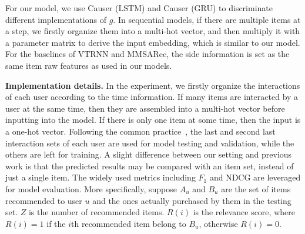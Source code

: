 \documentclass[conference]{IEEEtran}
\theoremstyle{definition}
\theoremstyle{theorem}
\theoremstyle{proof}
\theoremstyle{remark}
\begin{document}
For our model, we use Causer (LSTM) and Causer (GRU) to discriminate different implementations of $g$.
In sequential models, if there are multiple items at a step, we firstly organize them into a multi-hot vector, and then multiply it with a parameter matrix to derive the input embedding, which is similar to our model.
{For the baselines of VTRNN and MMSARec, the side information is set as the same item raw features as used in our models.}



\noindent
\textbf{Implementation details.}
In the experiment, we firstly organize the interactions of each user according to the time information.
If many items are interacted by a user at the same time, then they are assembled into a multi-hot vector before inputting into the model.
If there is only one item at some time, then the input is a one-hot vector.
Following the common practice~\cite{li2017neural,liu2018stamp}, the last and second last interaction sets of each user are used for model testing and validation, while the others are left for training. A slight difference between our setting and previous work is that the predicted results may be compared with an item set, instead of just a single item.
The widely used metrics including $F_1$ and NDCG are leveraged for model evaluation.
More specifically, suppose $A_{u}$ and $B_{u}$ are the set of items recommended to user $u$ and the ones actually purchased by them in the testing set.
$Z$ is the number of recommended items.
$R(i)$ is the relevance score, where $R(i) = 1$ if the $i$th recommended item belong to $B_{u}$, otherwise $R(i)=0$.
\end{document}
